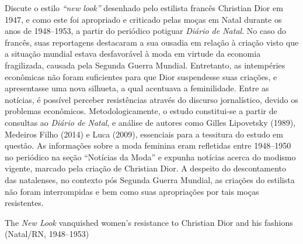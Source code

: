\begin{refsection}
    \begin{galoResumo}
        Discute o estilo \textit{``new look''} desenhado pelo estilista francês Christian Dior em 1947, e como este foi apropriado e criticado pelas moças em Natal durante os anos de 1948--1953, a partir do periódico potiguar \textit{Diário de Natal}. No caso do francês, suas reportagens destacaram a sua ousadia em relação à criação visto que a situação mundial estava desfavorável à moda em virtude da economia fragilizada, causada pela Segunda Guerra Mundial. Entretanto, as intempéries econômicas não foram suficientes para que Dior suspendesse suas criações, e apresentasse uma nova silhueta, a qual acentuava a feminilidade. Entre as notícias, é possível perceber resistências através do discurso jornalístico, devido os problemas econômicos. Metodologicamente, o estudo constitui-se a partir de consultas ao \textit{Diário de Natal}, e análise de autores como Gilles Lipovetsky (1989), Medeiros Filho (2014) e Luca (2009), essenciais para a tessitura do estudo em questão. As informações sobre a moda feminina eram refletidas entre 1948--1950 no periódico na seção ``Notícias da Moda'' e expunha notícias acerca do modismo vigente, marcado pela criação de Christian Dior. A despeito do descontamento das natalenses, no contexto pós Segunda Guerra Mundial, as criações do estilista não foram interrompidas e bem como suas apropriações por tais moças resistentes.
    \end{galoResumo}
    

    \filbreak

    \begin{otherlanguage}{english}

    \fakeChapterTwoLines
    {The \textit{New Look} vanquished}
    {women's resistance to Christian Dior and his fashions (Natal/RN, 1948--1953)}


\end{otherlanguage}
\end{refsection}
